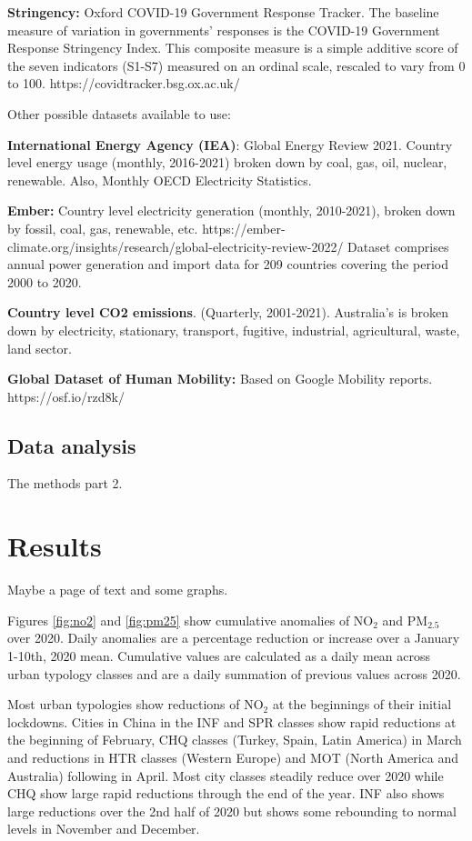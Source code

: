 \documentclass[preprint,12pt]{elsarticle}
\begin{document}
\textbf{Stringency: } Oxford COVID-19 Government Response Tracker. The baseline measure of variation in governments' responses is the COVID-19 Government Response Stringency Index. This composite measure is a simple additive score of the seven indicators (S1-S7) measured on an ordinal scale, rescaled to vary from 0 to 100.
https://covidtracker.bsg.ox.ac.uk/


Other possible datasets available to use:

\textbf{International Energy Agency (IEA)}: Global Energy Review 2021. 
Country level energy usage (monthly, 2016-2021) broken down by coal, gas, oil, nuclear, renewable.
Also, Monthly OECD Electricity Statistics. 

\textbf{Ember:} Country level electricity generation (monthly, 2010-2021), broken down by fossil, coal, gas, renewable, etc.
https://ember-climate.org/insights/research/global-electricity-review-2022/
Dataset comprises annual power generation and import data for 209 countries covering the period 2000 to 2020. 

\textbf{Country level CO2 emissions}. (Quarterly, 2001-2021). Australia's is broken down by electricity, stationary, transport, fugitive, industrial, agricultural, waste, land sector.

\textbf{Global Dataset of Human Mobility:} Based on Google Mobility reports.
https://osf.io/rzd8k/




\subsection*{Data analysis}
The methods part 2.



\section*{Results}
Maybe a page of text and some graphs.

Figures \ref{fig:no2} and \ref{fig:pm25} show cumulative anomalies of NO$_{2}$ and PM$_{2.5}$ over 2020. Daily anomalies are a percentage reduction or increase over a January 1-10th, 2020 mean. Cumulative values are calculated as a daily mean across urban typology classes and are a daily summation of previous values across 2020.

Most urban typologies show reductions of NO$_{2}$ at the beginnings of their initial lockdowns. Cities in China in the INF and SPR classes show rapid reductions at the beginning of February, CHQ classes (Turkey, Spain, Latin America) in March and reductions in HTR classes (Western Europe) and MOT (North America and Australia) following in April. Most city classes steadily reduce over 2020 while CHQ show large rapid reductions through the end of the year. INF also shows large reductions over the 2nd half of 2020 but shows some rebounding to normal levels in November and December.
\end{document}
